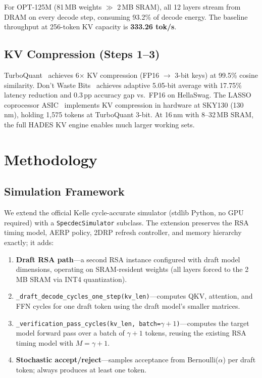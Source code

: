 \documentclass[conference]{IEEEtran}
\begin{document}
For OPT-125M (81\,MB weights $\gg$ 2\,MB SRAM), all 12 layers stream from DRAM
on every decode step, consuming 93.2\% of decode energy.
The baseline throughput at 256-token KV capacity is \textbf{333.26 tok/s}.

\subsection{KV Compression (Steps 1--3)}

TurboQuant~\cite{turboquant} achieves 6$\times$ KV compression (FP16 $\to$ 3-bit
keys) at 99.5\% cosine similarity.
Don't Waste Bits~\cite{dontwastebits} achieves adaptive 5.05-bit average with
17.75\% latency reduction and 0.3\,pp accuracy gap vs.\ FP16 on HellaSwag.
The LASSO coprocessor ASIC~\cite{lasso} implements KV compression in hardware
at SKY130 (130\,nm), holding 1,575 tokens at TurboQuant 3-bit.
At 16\,nm with 8--32\,MB SRAM, the full HADES KV engine enables much larger
working sets.

\section{Methodology}

\subsection{Simulation Framework}

We extend the official Kelle cycle-accurate simulator (stdlib Python, no GPU
required) with a \texttt{SpecdecSimulator} subclass.
The extension preserves the RSA timing model, AERP policy, 2DRP refresh
controller, and memory hierarchy exactly; it adds:

\begin{enumerate}
  \item \textbf{Draft RSA path}---a second RSA instance configured with draft
        model dimensions, operating on SRAM-resident weights (all layers forced
        to the 2\,MB SRAM via INT4 quantization).
  \item \texttt{\_draft\_decode\_cycles\_one\_step(kv\_len)}---computes QKV,
        attention, and FFN cycles for one draft token using the draft model's
        smaller matrices.
  \item \texttt{\_verification\_pass\_cycles(kv\_len, batch=$\gamma{+}1$)}---computes
        the target model forward pass over a batch of $\gamma{+}1$ tokens,
        reusing the existing RSA timing model with $M = \gamma{+}1$.
  \item \textbf{Stochastic accept/reject}---samples acceptance from
        Bernoulli($\alpha$) per draft token; always produces at least one token.
\end{enumerate}
\end{document}
